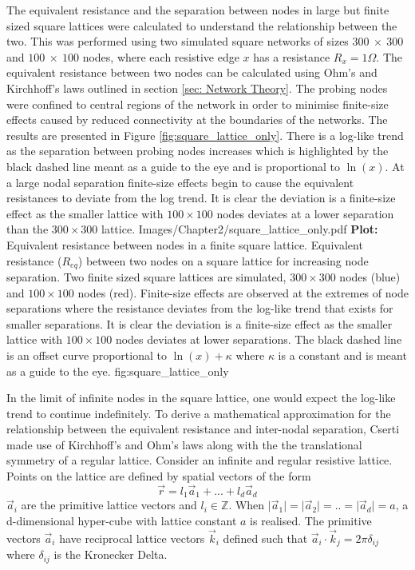The equivalent resistance and the separation between nodes in large but finite sized square lattices were calculated to understand the relationship between the two. This was performed using two simulated square networks of sizes $300~\times~300$ and $100~\times~100$ nodes, where each resistive edge $x$ has a resistance $ R_x = 1 \Omega$. The equivalent resistance between two nodes can be calculated using Ohm's and Kirchhoff's laws outlined in section \ref{sec: Network Theory}. The probing nodes were confined to central regions of the network in order to minimise finite-size effects caused by reduced connectivity at the boundaries of the networks. The results are presented in Figure \ref{fig:square_lattice_only}. There is a log-like trend as the separation between probing nodes increases which is highlighted by the black dashed line meant as a guide to the eye and is proportional to $\ln(x)$. At a large nodal separation finite-size effects begin to cause the equivalent resistances to deviate from the log trend. It is clear the deviation is a finite-size effect as the smaller lattice with $100 \times 100$ nodes deviates at a lower separation than the $300 \times 300$ lattice. 
{Images/Chapter2/square_lattice_only.pdf}
{\textbf{Plot:} Equivalent resistance between nodes in a finite square lattice.}
{Equivalent resistance ($R_{eq}$) between two nodes on a square lattice for increasing node separation. Two finite sized square lattices are simulated, $300\times 300$ nodes (blue) and $100 \times 100$ nodes (red). Finite-size effects are observed at the extremes of node separations where the resistance deviates from the log-like trend that exists for smaller separations. It is clear the deviation is a finite-size effect as the smaller lattice with $100\times 100$ nodes deviates at lower separations. The black dashed line is an offset curve proportional to $\ln(x) + \kappa$ where $\kappa$ is a constant and is meant as a guide to the eye.}
{fig:square_lattice_only}

In the limit of infinite nodes in the square lattice, one would expect the log-like trend to continue indefinitely. To derive a mathematical approximation for the relationship between the equivalent resistance and inter-nodal separation, Cserti made use of Kirchhoff's and Ohm's laws along with the the translational symmetry of a regular lattice\cite{cserti2000}.
Consider an infinite and regular resistive lattice. Points on the lattice are defined by spatial vectors of the form
\begin{equation}
\vec{r} = l_1 \vec{a}_1 +...+ l_d \vec{a}_d
\end{equation}
$\vec{a}_\textit{i}$ are the primitive lattice vectors and $l_\textit{i} \in \mathbb{Z}$. When $\vert \vec{a}_1 \vert=\vert \vec{a}_2 \vert=..=\vert \vec{a}_d \vert = a$, a d-dimensional hyper-cube with lattice constant $a$ is realised. The primitive vectors $\vec{a}_\textit{i}$ have reciprocal lattice vectors $\vec{k}_\textit{i}$ defined such that $\vec{a}_\textit{i} \cdot \vec{k}_\textit{j} = 2 \pi \delta_{\textit{ij}}$ where $\delta_{\textit{ij}}$ is the Kronecker Delta.  

